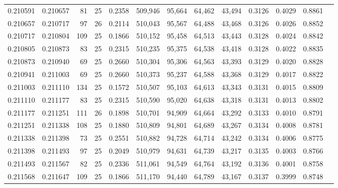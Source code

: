 \begin{tabular}{rrrrrrrrrrrrr}
0.210591 & 0.210657 &    81 &  25 &                                     0.2358 & 509,946 &  95,664 &  64,462 &  43,494 & 0.3126 & 0.4029 & 0.8861 \\
0.210657 & 0.210717 &    97 &  26 &                                     0.2114 & 510,043 &  95,567 &  64,488 &  43,468 & 0.3126 & 0.4026 & 0.8852 \\
0.210717 & 0.210804 &   109 &  25 &                                     0.1866 & 510,152 &  95,458 &  64,513 &  43,443 & 0.3128 & 0.4024 & 0.8842 \\
0.210805 & 0.210873 &    83 &  25 &                                     0.2315 & 510,235 &  95,375 &  64,538 &  43,418 & 0.3128 & 0.4022 & 0.8835 \\
0.210873 & 0.210940 &    69 &  25 &                                     0.2660 & 510,304 &  95,306 &  64,563 &  43,393 & 0.3129 & 0.4020 & 0.8828 \\
0.210941 & 0.211003 &    69 &  25 &                                     0.2660 & 510,373 &  95,237 &  64,588 &  43,368 & 0.3129 & 0.4017 & 0.8822 \\
0.211003 & 0.211110 &   134 &  25 &                                     0.1572 & 510,507 &  95,103 &  64,613 &  43,343 & 0.3131 & 0.4015 & 0.8809 \\
0.211110 & 0.211177 &    83 &  25 &                                     0.2315 & 510,590 &  95,020 &  64,638 &  43,318 & 0.3131 & 0.4013 & 0.8802 \\
0.211177 & 0.211251 &   111 &  26 &                                     0.1898 & 510,701 &  94,909 &  64,664 &  43,292 & 0.3133 & 0.4010 & 0.8791 \\
0.211251 & 0.211338 &   108 &  25 &                                     0.1880 & 510,809 &  94,801 &  64,689 &  43,267 & 0.3134 & 0.4008 & 0.8781 \\
0.211338 & 0.211398 &    73 &  25 &                                     0.2551 & 510,882 &  94,728 &  64,714 &  43,242 & 0.3134 & 0.4006 & 0.8775 \\
0.211398 & 0.211493 &    97 &  25 &                                     0.2049 & 510,979 &  94,631 &  64,739 &  43,217 & 0.3135 & 0.4003 & 0.8766 \\
0.211493 & 0.211567 &    82 &  25 &                                     0.2336 & 511,061 &  94,549 &  64,764 &  43,192 & 0.3136 & 0.4001 & 0.8758 \\
0.211568 & 0.211647 &   109 &  25 &                                     0.1866 & 511,170 &  94,440 &  64,789 &  43,167 & 0.3137 & 0.3999 & 0.8748 \\

\end{tabular}
